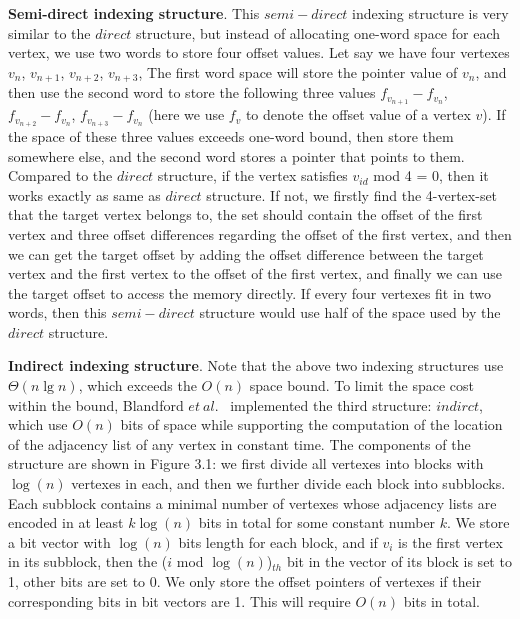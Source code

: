\documentclass[12pt,glossary]{dalthesis}
\begin{document}
\textbf{Semi-direct indexing structure}. This $semi-direct$ indexing structure is very similar to the $direct$ structure, but instead of allocating one-word space for each vertex, we use two words to store four offset values. Let say we have four vertexes $v_{n}$, $v_{n+1}$, $v_{n+2}$, $v_{n+3}$, The first word space will store the pointer value of $v_{n}$, and then use the second word to store the following three values $f_{v_{n+1}}-f_{v_{n}}$, $f_{v_{n+2}}-f_{v_{n}}$, $f_{v_{n+3}}-f_{v_{n}}$ (here we use $f_{v}$ to denote the offset value of a vertex $v$). If the space of these three values exceeds one-word bound, then store them somewhere else, and the second word stores a pointer that points to them. Compared to the $direct$ structure, if the vertex satisfies $v_{id}$ mod 4 = 0, then it works exactly as same as $direct$ structure. If not, we firstly find the 4-vertex-set that the target vertex belongs to, the set should contain the offset of the first vertex and three offset differences regarding the offset of the first vertex, and then we can get the target offset by adding the offset difference between the target vertex and the first vertex to the offset of the first vertex, and finally we can use the target offset to access the memory directly. If every four vertexes fit in two words, then this $semi-direct$ structure would use half of the space used by the $direct$ structure.     

\bigskip
\bigskip

\textbf{Indirect indexing structure}. Note that the above two indexing structures use $ \Theta (n\lg n)$, which exceeds the $O(n)$ space bound. To limit the space cost within the bound, Blandford $et \ al.$~\cite{compact-representation} implemented the third structure: $indirct$, which use $O(n)$ bits of space while supporting the computation of the location of the adjacency list of any vertex in constant time. The components of the structure are shown in  Figure 3.1: we first divide all vertexes into blocks with $\log(n)$ vertexes in each, and then we further divide each block into subblocks. Each subblock contains a minimal number of vertexes whose adjacency lists are encoded in at least $k\log(n)$ bits in total for some constant number $k$. We store a bit vector with $\log(n)$ bits length for each block, and if $v_{i}$ is the first vertex in its subblock, then the ($i$ mod $\log (n)$)$_{th}$ bit in the vector of its block is set to 1, other bits are set to 0. We only store the offset pointers of vertexes if their corresponding bits in bit vectors are 1. This will require $O(n)$ bits in total. 
\end{document}
